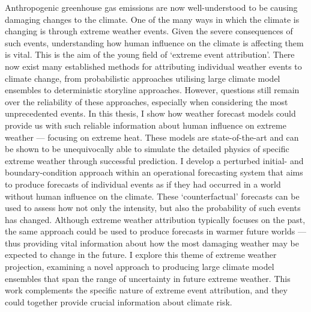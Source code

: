 Anthropogenic greenhouse gas emissions are now well-understood to be causing damaging changes to the climate. One of the many ways in which the climate is changing is through extreme weather events. Given the severe consequences of such events, understanding how human influence on the climate is affecting them is vital. This is the aim of the young field of `extreme event attribution'. There now exist many established methods for attributing individual weather events to climate change, from probabilistic approaches utilising large climate model ensembles to deterministic storyline approaches. However, questions still remain over the reliability of these approaches, especially when considering the most unprecedented events. In this thesis, I show how weather forecast models could provide us with such reliable information about human influence on extreme weather --- focusing on extreme heat. These models are state-of-the-art and can be shown to be unequivocally able to simulate the detailed physics of specific extreme weather through successful prediction. I develop a perturbed initial- and boundary-condition approach within an operational forecasting system that aims to produce forecasts of individual events as if they had occurred in a world without human influence on the climate. These `counterfactual' forecasts can be used to assess how not only the intensity, but also the probability of such events has changed. Although extreme weather attribution typically focuses on the past, the same approach could be used to produce forecasts in warmer future worlds --- thus providing vital information about how the most damaging weather may be expected to change in the future. I explore this theme of extreme weather projection, examining a novel approach to producing large climate model ensembles that span the range of uncertainty in future extreme weather. This work complements the specific nature of extreme event attribution, and they could together provide crucial information about climate risk. 